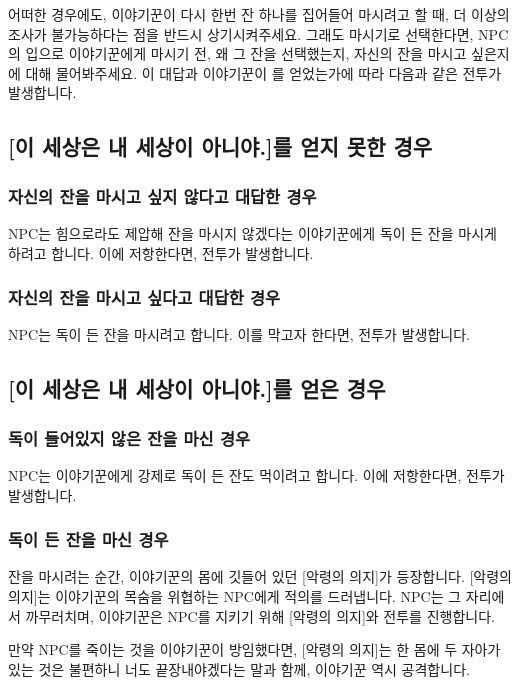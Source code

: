 \documentclass{report}
\begin{document}
	어떠한 경우에도, 이야기꾼이 다시 한번 잔 하나를 집어들어 마시려고 할 때, 더 이상의 조사가 불가능하다는 점을 반드시 상기시켜주세요. 그래도 마시기로 선택한다면, NPC의 입으로 이야기꾼에게 마시기 전, 왜 그 잔을 선택했는지, 자신의 잔을 마시고 싶은지에 대해 물어봐주세요. 이 대답과 이야기꾼이 를 얻었는가에 따라 다음과 같은 전투가 발생합니다.
	
	\subsection{[이 세상은 내 세상이 아니야.]를 얻지 못한 경우}
		\subsubsection{자신의 잔을 마시고 싶지 않다고 대답한 경우}
			NPC는 힘으로라도 제압해 잔을 마시지 않겠다는 이야기꾼에게 독이 든 잔을 마시게 하려고 합니다. 이에 저항한다면, 전투가 발생합니다.
			
		\subsubsection{자신의 잔을 마시고 싶다고 대답한 경우}
			NPC는 독이 든 잔을 마시려고 합니다. 이를 막고자 한다면, 전투가 발생합니다.
	
	\subsection{[이 세상은 내 세상이 아니야.]를 얻은 경우}
		\subsubsection{독이 들어있지 않은 잔을 마신 경우}
			NPC는 이야기꾼에게 강제로 독이 든 잔도 먹이려고 합니다. 이에 저항한다면, 전투가 발생합니다.
		
		\subsubsection{독이 든 잔을 마신 경우}
			잔을 마시려는 순간, 이야기꾼의 몸에 깃들어 있던 [악령의 의지]가 등장합니다. [악령의 의지]는 이야기꾼의 목숨을 위협하는 NPC에게 적의를 드러냅니다. NPC는 그 자리에서 까무러치며, 이야기꾼은 NPC를 지키기 위해 [악령의 의지]와 전투를 진행합니다.
			
			만약 NPC를 죽이는 것을 이야기꾼이 방임했다면, [악령의 의지]는 한 몸에 두 자아가 있는 것은 불편하니 너도 끝장내야겠다는 말과 함께, 이야기꾼 역시 공격합니다.
			
\end{document}
